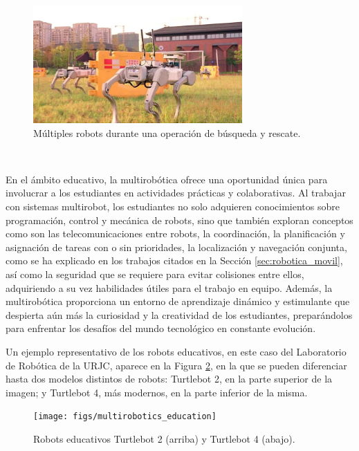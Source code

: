 \begin{figure} [h!]
  \begin{center}
    \includegraphics[width=8cm]{figs/multirobotics_in_search_and_rescue}
  \end{center}
  \caption{Múltiples robots durante una operación de búsqueda y rescate.}
  \label{fig:multirobots}
\end{figure}\

En el ámbito educativo, la multirobótica ofrece una oportunidad única para
involucrar a los estudiantes en actividades prácticas y colaborativas.
Al trabajar con sistemas multirobot, los estudiantes no solo adquieren
conocimientos sobre programación, control y mecánica de robots, sino que también
exploran conceptos como son las telecomunicaciones entre robots, la coordinación,
la planificación y asignación de tareas con o sin prioridades, la localización y
navegación conjunta, como se ha explicado en los trabajos citados en la Sección
\ref{sec:robotica_movil}, así como la seguridad que se requiere para evitar
colisiones entre ellos, adquiriendo a su vez habilidades útiles para el trabajo
en equipo.
Además, la multirobótica proporciona un entorno de aprendizaje dinámico y
estimulante que despierta aún más la curiosidad y la creatividad de los
estudiantes, preparándolos para enfrentar los desafíos del mundo tecnológico en
constante evolución.

Un ejemplo representativo de los robots educativos, en este caso del Laboratorio
de Robótica de la URJC, aparece en la Figura \ref{fig:robots_education}, en la
que se pueden diferenciar hasta dos modelos distintos de robots: Turtlebot 2, en
la parte superior de la imagen; y Turtlebot 4, más modernos, en la parte
inferior de la misma.

\begin{figure} [h!]
  \begin{center}
    \texttt{[image: figs/multirobotics\_education]}
  \end{center}
  \caption{Robots educativos Turtlebot 2 (arriba) y Turtlebot 4 (abajo).}
  \label{fig:robots_education}
\end{figure}\



